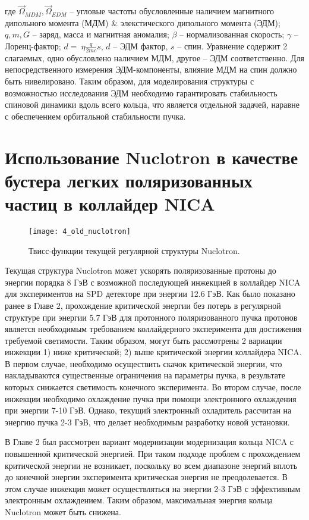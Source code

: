 \noindent где $\vec{\Omega}_{MDM}, \vec{\Omega}_{EDM}$ -- угловые частоты обусловленные наличием магнитного дипольного момента (МДМ) \& элекстического дипольного момента (ЭДМ); $q, m, G$ -- заряд, масса и магнитная аномалия; $\beta$ -- нормализованная скорость; $\gamma$ -- Лоренц-фактор; $d =~\eta \frac{q}{2mc}s$, $d$ -- ЭДМ фактор, $s$ -- спин. Уравнение содержит 2 слагаемых, одно обусловлено наличием МДМ, другое – ЭДМ соответственно. Для непосредственного измерения ЭДМ-компоненты, влияние МДМ на спин должно быть нивелировано.
\noindent Таким образом, для моделирования структуры с возможностью исследования ЭДМ необходимо гарантировать стабильность спиновой динамики вдоль всего кольца, что является отдельной задачей, наравне с обеспечением орбитальной стабильности пучка. 

	\section{Использование Nuclotron в качестве бустера легких поляризованных частиц в коллайдер NICA}\label{sec:EDM/nuclotron}
	
\begin{figure}[!h]
  \centering
	\texttt{[image: 4\_old\_nuclotron]}
   \caption{Твисс-функции текущей регулярной структуры Nuclotron.}
   \label{fig:4_old_nuclotron}
\end{figure}

\par Текущая структура Nuclotron может ускорять поляризованные протоны до энергии порядка 8 ГэВ с возможной последующей инжекцией в коллайдер NICA для экспериментов на SPD детекторе при энергии 12.6 ГэВ. Как было показано ранее в Главе 2, прохождение критической энергии без потерь в регулярной структуре при энергии 5.7 ГэВ для протонного поляризованного пучка протонов является необходимым требованием коллайдерного эксперимента для достижения требуемой светимости. Таким образом, могут быть рассмотрены 2 вариации инжекции 1) ниже критической; 2) выше критической энергии коллайдера NICA. В первом случае, необходимо осуществить скачок критической энергии, что накладываются существенные ограничения на параметры пучка, в результате которых снижается светимость конечного эксперимента. Во втором случае, после инжекции необходимо охлаждение пучка при помощи электронного охлаждения при энергии 7-10 ГэВ. Однако, текущий электронный охладитель рассчитан на энергию пучка 2-3 ГэВ, что делает необходимым разработку новой установки.

\noindent В Главе 2 был рассмотрен вариант модернизации модернизация кольца NICA с повышенной критической энергией. При таком подходе проблем с прохождением критической энергии не возникает, поскольку во всем диапазоне энергий вплоть до конечной энергии эксперимента критическая энергия не преодолевается. В этом случае инжекция может осуществляться на энергии 2-3 ГэВ с эффективным электронным охлаждением. Таким образом, максимальная энергия кольца Nuclotron может быть снижена.

